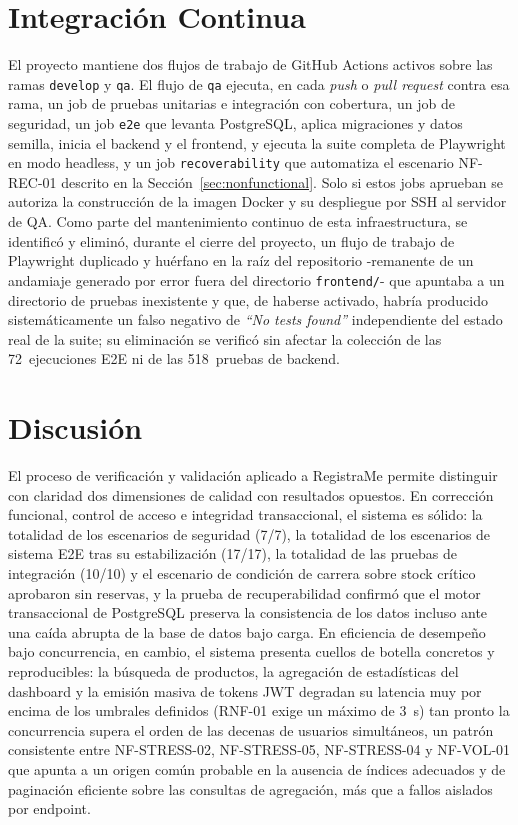 \documentclass[conference]{IEEEtran}
\begin{document}
\section{Integración Continua}
\label{sec:cicd}

El proyecto mantiene dos flujos de trabajo de GitHub Actions activos sobre las ramas \texttt{develop} y \texttt{qa}. El flujo de \texttt{qa} ejecuta, en cada \emph{push} o \emph{pull request} contra esa rama, un job de pruebas unitarias e integración con cobertura, un job de seguridad, un job \texttt{e2e} que levanta PostgreSQL, aplica migraciones y datos semilla, inicia el backend y el frontend, y ejecuta la suite completa de Playwright en modo headless, y un job \texttt{recoverability} que automatiza el escenario NF-REC-01 descrito en la Sección~\ref{sec:nonfunctional}. Solo si estos jobs aprueban se autoriza la construcción de la imagen Docker y su despliegue por SSH al servidor de QA. Como parte del mantenimiento continuo de esta infraestructura, se identificó y eliminó, durante el cierre del proyecto, un flujo de trabajo de Playwright duplicado y huérfano en la raíz del repositorio -remanente de un andamiaje generado por error fuera del directorio \texttt{frontend/}- que apuntaba a un directorio de pruebas inexistente y que, de haberse activado, habría producido sistemáticamente un falso negativo de \emph{``No tests found''} independiente del estado real de la suite; su eliminación se verificó sin afectar la colección de las 72~ejecuciones E2E ni de las 518~pruebas de backend.

\section{Discusión}
\label{sec:discussion}

El proceso de verificación y validación aplicado a RegistraMe permite distinguir con claridad dos dimensiones de calidad con resultados opuestos. En corrección funcional, control de acceso e integridad transaccional, el sistema es sólido: la totalidad de los escenarios de seguridad (7/7), la totalidad de los escenarios de sistema E2E tras su estabilización (17/17), la totalidad de las pruebas de integración (10/10) y el escenario de condición de carrera sobre stock crítico aprobaron sin reservas, y la prueba de recuperabilidad confirmó que el motor transaccional de PostgreSQL preserva la consistencia de los datos incluso ante una caída abrupta de la base de datos bajo carga. En eficiencia de desempeño bajo concurrencia, en cambio, el sistema presenta cuellos de botella concretos y reproducibles: la búsqueda de productos, la agregación de estadísticas del dashboard y la emisión masiva de tokens JWT degradan su latencia muy por encima de los umbrales definidos (RNF-01 exige un máximo de 3~s) tan pronto la concurrencia supera el orden de las decenas de usuarios simultáneos, un patrón consistente entre NF-STRESS-02, NF-STRESS-05, NF-STRESS-04 y NF-VOL-01 que apunta a un origen común probable en la ausencia de índices adecuados y de paginación eficiente sobre las consultas de agregación, más que a fallos aislados por endpoint.
\end{document}
